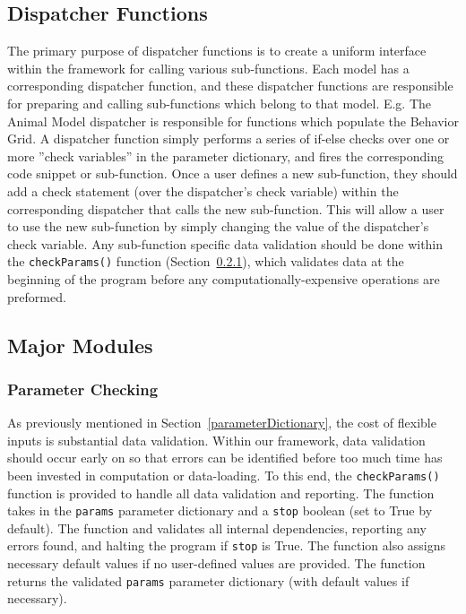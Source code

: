 \subsection{Dispatcher Functions}
\label{dispatcherFunctions}
The primary purpose of dispatcher functions is to create a uniform interface within the framework for calling various sub-functions.  Each model has a corresponding dispatcher function, and these dispatcher functions are responsible for preparing and calling sub-functions which belong to that model.  E.g. The Animal Model dispatcher is responsible for functions which populate the Behavior Grid.  A dispatcher function simply performs a series of if-else checks over one or more ''check variables'' in the parameter dictionary, and fires the corresponding code snippet or sub-function.  Once a user defines a new sub-function, they should add a check statement (over the dispatcher's check variable) within the corresponding dispatcher that calls the new sub-function.  This will allow a user to use the new sub-function by simply changing the value of the dispatcher's check variable.  Any sub-function specific data validation should be done within the \texttt{checkParams()} function (Section~\ref{checkParams}), which validates data at the beginning of the program before any computationally-expensive operations are preformed.


\subsection{Major Modules}
\label{majorModules}
\subsubsection{Parameter Checking}
\label{checkParams}
As previously mentioned in Section~\ref{parameterDictionary}, the cost of flexible inputs is substantial data validation.  Within our framework, data validation should occur early on so that errors can be identified before too much time has been invested in computation or data-loading.  To this end, the \texttt{checkParams()} function is provided to handle all data validation and reporting.  The function takes in the \texttt{params} parameter dictionary and a \texttt{stop} boolean (set to True by default).  The function and validates all internal dependencies, reporting any errors found, and halting the program if \texttt{stop} is True.  The function also assigns necessary default values if no user-defined values are provided.  The function returns the validated \texttt{params} parameter dictionary (with default values if necessary).  

